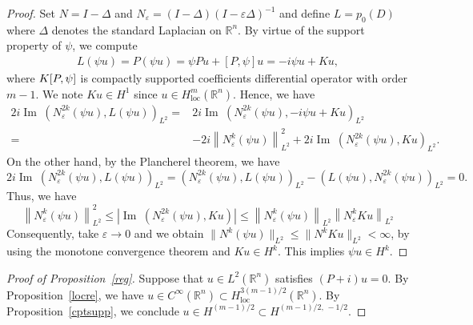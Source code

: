 \documentclass[10pt]{amsart}
\theoremstyle{definition}
\let\coloneqq\relax
\newcommand*\e{\varepsilon}
\newcommand*\g{\psi}
\newcommand*\re{\mathbb{R}}
\newcommand*\coloneqq{\mathrel{\mathop:}=}
\DeclareMathOperator{\Iml}{Im\;}
\DeclareMathOperator{\loc}{loc}
\begin{document}
\begin{proof}
Set $N = I - \Delta$ and $N_{\e} = (I - \Delta)(I - \e \Delta)^{-1}$ and define $L =p_0(D)$ where $\Delta$ denotes the standard Laplacian on $\re^n$. By virtue of the support property of $\g$, we compute
\begin{align*}
L(\g u) = P(\g u) = \g Pu + [P, \g]u =- i\g u + Ku,
\end{align*}
where $K\coloneqq [P, \g]$ is compactly supported coefficients differential operator with order $m-1$. We note $Ku \in H^1$ since $u\in H^m_{\loc}(\re^n)$. Hence, we have
\begin{align*}
2i\Iml\left(N_\e^{2k}(\g u), L(\g u)\right)_{L^2} = & 2i\Iml\left(N_\e^{2k}(\g u), -i\g u + Ku\right)_{L^2}\\
= & -2i\left\| N_\e^{k} (\g u)\right\|_{L^2}^2 + 2i\Iml\left(N_\e^{2k} (\g u), Ku\right)_{L^2}.
\end{align*}
On the other hand, by the Plancherel theorem, we have
\[
2i\Iml \left(N_\e^{2k} (\g u), L(\g u)\right)_{L^2} = \left(N_\e^{2k} (\g u), L(\g u)\right)_{L^2} - \left(L(\g u), N_\e^{2k} (\g u)\right)_{L^2}=0.
\]
Thus, we have
\[
\left\| N_\e^{k} (\g u) \right\|_{L^2}^2
\leq \left| \Iml \left(N_{\e}^{2k} (\g u), Ku\right) \right| \leq \left\| N_\e^{k} (\g u)\right\|_{L^2} \left\| N_\e^{k} Ku\right\|_{L^2}
\]
Consequently, take $\e \to 0$ and we obtain $\| N^{k} (\g u)\|_{L^2}\leq \| N^{k} Ku \|_{L^2}< \infty$, by using the monotone convergence theorem and $Ku \in H^k$. This implies $\g u \in H^k$.
\end{proof}

\begin{proof}[Proof of Proposition~\ref{reg}]
Suppose that $u\in L^2(\re^n)$ satisfies $(P+i)u=0$. By Proposition~\ref{locre}, we have $u\in C^{\infty}(\re^n)\subset H^{3(m-1)/2}_{\loc}(\re^n)$. By Proposition~\ref{cptsupp}, we conclude $u\in H^{(m-1)/2}\subset H^{(m-1)/2,\,-1/2}$.
\end{proof}
\end{document}
